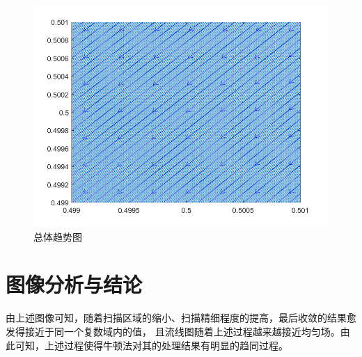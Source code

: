\documentclass[UTF8,a4paper,10pt]{ctexart}
\begin{document}
 \newline
	\begin{figure}[!htbp]
		\centering
		\includegraphics[width=1\textwidth,height=1\textwidth]{pictures/4_3.png}
		\caption{总体趋势图} \label{4_3}
	\end{figure}

  \section{图像分析与结论}
  由上述图像可知，随着扫描区域的缩小、扫描精细程度的提高，最后收敛的结果愈发得接近于同一个复数域内的值，
  且流线图随着上述过程越来越接近均匀场。由此可知，上述过程使得牛顿法对其的处理结果有明显的趋同过程。


\end{document}
